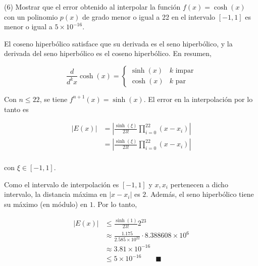 \documentclass[12pt]{article}
\begin{document}
\pagebreak 

\begin{myframe}
    (6) Mostrar que el error obtenido al interpolar la función $f(x) = \cosh(x)$ con un polinomio $p(x)$ de grado menor o igual a 22 en el intervalo $[-1,1]$ es menor o igual a $5 \times 10^{-16}$.
\end{myframe}

El coseno hiperbólico satisface que su derivada es el seno hiperbólico, y la
derivada del seno hiperbólico es el coseno hiperbólico. En resumen, 

\begin{equation*}
    \frac{d}{d^kx} \cosh(x) = \begin{cases}
        \sinh(x) & k \text{ impar}\\ 
        \cosh(x) & k \text{ par}
    \end{cases}
\end{equation*}

Con $n \leq 22$, se tiene $f^{n+1}(x) = \sinh(x)$. El error en la interpolación
por lo tanto es 

\begin{align*}
    \left| E(x) \right| 
    &= \left| \frac{\sinh(\xi)}{23!}\prod_{i=0}^{22}(x-x_i) \right| \\ 
    &=\left| \frac{\sinh(\xi)}{23!}\prod_{i=0}^{22}(x-x_i) \right| \\ 
\end{align*}

con $\xi \in [-1, 1]$.

Como el intervalo de interpolación es $[-1, 1]$ y $x, x_i$ pertenecen a dicho
intervalo, la distancia máxima en $\left| x - x_i \right| $ es $2$. Además, el
seno hiperbólico tiene su máximo (en módulo) en $1$. Por lo tanto, 

\begin{align*}
    \left| E(x) \right| 
    &\leq \frac{\sinh(1)}{23!} 2^{23} \\ 
    &\approx \frac{1.175}{2.585 \times 10^{22}} \cdot 8.388608
    \times 10^{6} \\ 
    &\approx 3.81 \times 10^{-16} \\ 
    &\leq 5 \times 10^{-16} \qquad \blacksquare
\end{align*}

\pagebreak 
\end{document}
